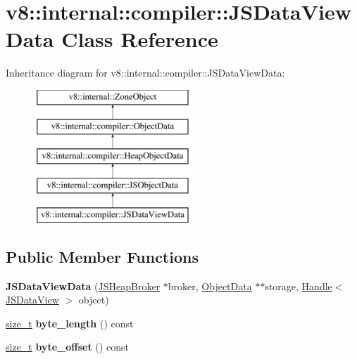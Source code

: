 \hypertarget{classv8_1_1internal_1_1compiler_1_1JSDataViewData}{}\section{v8\+:\+:internal\+:\+:compiler\+:\+:J\+S\+Data\+View\+Data Class Reference}
\label{classv8_1_1internal_1_1compiler_1_1JSDataViewData}
Inheritance diagram for v8\+:\+:internal\+:\+:compiler\+:\+:J\+S\+Data\+View\+Data\+:\begin{figure}[H]
\begin{center}
\leavevmode
\includegraphics[height=5.000000cm]{classv8_1_1internal_1_1compiler_1_1JSDataViewData}
\end{center}
\end{figure}
\subsection*{Public Member Functions}
\begin{DoxyCompactItemize}
\item 
\mbox{\label{classv8_1_1internal_1_1compiler_1_1JSDataViewData_a00c9c4462ae0035ffc4304d803674aa0}} 
{\bfseries J\+S\+Data\+View\+Data} (\mbox{\hyperlink{classv8_1_1internal_1_1compiler_1_1JSHeapBroker}{J\+S\+Heap\+Broker}} $\ast$broker, \mbox{\hyperlink{classv8_1_1internal_1_1compiler_1_1ObjectData}{Object\+Data}} $\ast$$\ast$storage, \mbox{\hyperlink{classv8_1_1internal_1_1Handle}{Handle}}$<$ \mbox{\hyperlink{classv8_1_1internal_1_1JSDataView}{J\+S\+Data\+View}} $>$ object)
\item 
\mbox{\label{classv8_1_1internal_1_1compiler_1_1JSDataViewData_a15a1004506417e565edd5f22d134b16f}} 
\mbox{\hyperlink{classsize__t}{size\+\_\+t}} {\bfseries byte\+\_\+length} () const
\item 
\mbox{\label{classv8_1_1internal_1_1compiler_1_1JSDataViewData_a17de988e79438e8c09a3f4453d84a054}} 
\mbox{\hyperlink{classsize__t}{size\+\_\+t}} {\bfseries byte\+\_\+offset} () const
\end{DoxyCompactItemize}
